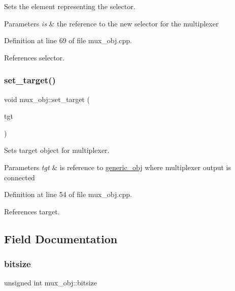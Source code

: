 Sets the element representing the selector. 


\begin{DoxyParams}{Parameters}
{\em is} & the reference to the new selector for the multiplexer \\
\hline
\end{DoxyParams}


Definition at line 69 of file mux\+\_\+obj.\+cpp.



References selector.

\mbox{\label{classmux__obj_a2307b43d9f2f26a12dac868d4bf4fc1a}} 
\subsubsection{\texorpdfstring{set\+\_\+target()}{set\_target()}}
{\footnotesize\ttfamily void mux\+\_\+obj\+::set\+\_\+target (\begin{DoxyParamCaption}\item[{const \hyperlink{generic__obj_8hpp_acb533b2ef8e0fe72e09a04d20904ca81}{generic\+\_\+obj\+Ref}}]{tgt }\end{DoxyParamCaption})}



Sets target object for multiplexer. 


\begin{DoxyParams}{Parameters}
{\em tgt} & is reference to \hyperlink{classgeneric__obj}{generic\+\_\+obj} where multiplexer output is connected \\
\hline
\end{DoxyParams}


Definition at line 54 of file mux\+\_\+obj.\+cpp.



References target.



\subsection{Field Documentation}
\mbox{\label{classmux__obj_abe7701f0be3d5c18240f3111254ec3e5}} 
\subsubsection{\texorpdfstring{bitsize}{bitsize}}
{\footnotesize\ttfamily unsigned int mux\+\_\+obj\+::bitsize\hspace{0.3cm}{\ttfamily [private]}}



